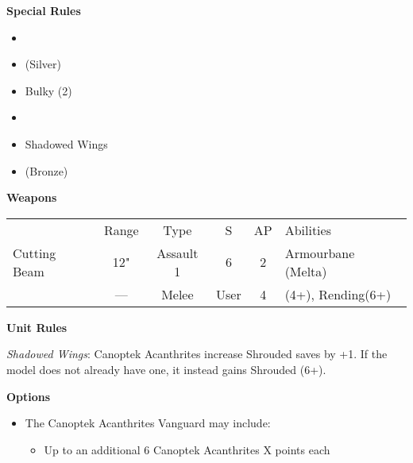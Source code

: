 \begin{minipage}[t]{0.72\textwidth}
\begin{minipage}[t]{0.5\textwidth}
\begin{flushleft}
			\textbf{Special Rules}
			\begin{itemize}
				\item {}
				\item {} (Silver)
				\item Bulky (2)
				\item {}
				\item Shadowed Wings
				\item {} (Bronze)
			\end{itemize}
		\end{flushleft}
	\end{minipage}
	
	\vspace*{2em}
	\textbf{Weapons}
	
	\begin{tabular}{m{95 pt} *{4}{c} >{\raggedright\arraybackslash}p{130pt}}
		& Range & Type & S & AP & Abilities \\
		Cutting Beam & 12" & Assault 1 & 6 & 2 & Armourbane (Melta) \\
		\quickref{Voidblade} & — & Melee & User & 4 & \quickref{Entropic Strike} (4+), Rending(6+) \\
	\end{tabular}
	
	\vspace*{2em}
	\textbf{Unit Rules}
	
	\textit{Shadowed Wings}: Canoptek Acanthrites increase Shrouded saves by +1. If the model does not already have one, it instead gains Shrouded (6+).
		
	\vspace*{2em}
	\textbf{Options}
	\begin{itemize}
		\item The Canoptek Acanthrites Vanguard may include:
		\begin{itemize}
			\item Up to an additional 6 Canoptek Acanthrites \dotfill X points each
		\end{itemize}
	\end{itemize}
\end{minipage}


\newpage
\subsubsection[Canoptek Scarab Swarms]{}

